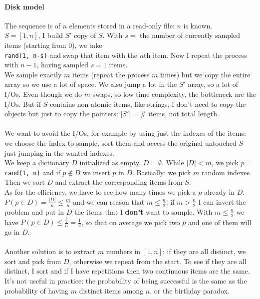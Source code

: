 \documentclass[10pt]{report}
\begin{document}
\paragraph{Disk model} The sequence is of $n$ elements stored in a read-only file: $n$ is known.\\
$S = [1, n]$, I build $S'$ copy of $S$. With $s =$ the number of currently sampled items (starting from $0$), we take\\\texttt{rand(1, n-s)} and swap that item with the $n$th item. Now I repeat the process with $n-1$, having sampled $s=1$ items.\\
We sample exactly $m$ items (repeat the process $m$ times) but we copy the entire array so we use a lot of space. We also jump a lot in the $S'$ array, so a lot of I/Os. Even though we do $m$ swaps, so low time complexity, the bottleneck are the I/Os. But if $S$ contains non-atomic items, like strings, I don't need to copy the objects but just to copy the pointers: $|S'| = \#$ items, not total length.\\\\
We want to avoid the I/Os, for example by using just the indexes of the items: we choose the index to sample, sort them and access the original untouched $S$ just jumping in the wanted indexes.\\
We keep a dictionary $D$ initialized as empty, $D=\emptyset$. While $|D|<m$, we pick $p =$ \texttt{rand(1, n)} and if $p\not\in D$ we insert $p$ in $D$. Basically: we pick $m$ random indexes. Then we sort $D$ and extract the corresponding items from $S$.\\
As for the efficiency, we have to see how many times we pick a $p$ already in $D$. $P(p\in D) = \frac{|D|}{n} \leq \frac{m}{n}$ and we can reason that $m\leq \frac{n}{2}$: if $m > \frac{n}{2}$ I can invert the problem and put in $D$ the items that I \textbf{don't} want to sample. With $m\leq \frac{n}{2}$ we have $P(p\in D) \leq \frac{\frac{n}{2}}{n} = \frac{1}{2}$, so that on average we pick two $p$ and one of them will go in $D$.\\\\
Another solution is to extract $m$ numbers in $[1, n]$: if they are all distinct, we sort and pick from $D$, otherwise we repeat from the start. To see if they are all distinct, I sort and if I have repetitions then two continuous items are the same.\\
It's not useful in practice: the probability of being successful is the same as the probability of having $m$ distinct items among $n$, or the birthday paradox.
\end{document}
